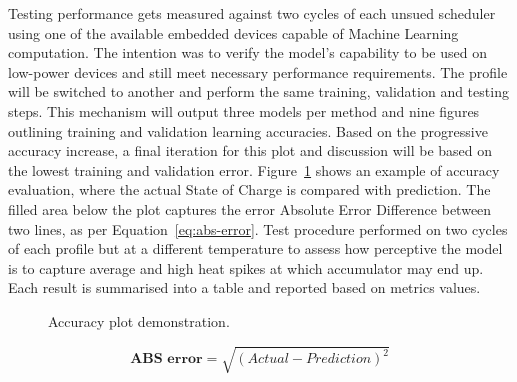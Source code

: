 %
Testing performance gets measured against two cycles of each unsued scheduler using one of the available embedded devices capable of Machine Learning computation.
The intention was to verify the model's capability to be used on low-power devices and still meet necessary performance requirements.
The profile will be switched to another and perform the same training, validation and testing steps.
This mechanism will output three models per method and nine figures outlining training and validation learning accuracies.
Based on the progressive accuracy increase, a final iteration for this plot and discussion will be based on the lowest training and validation error.
Figure~\ref{fig:plot_demo} shows an example of accuracy evaluation, where the actual State of Charge is compared with prediction.
The filled area below the plot captures the error Absolute Error Difference between two lines, as per Equation~\ref{eq:abs-error}.
Test procedure performed on two cycles of each profile but at a different temperature to assess how perceptive the model is to capture average and high heat spikes at which accumulator may end up.
Each result is summarised into a table and reported based on metrics values.
\begin{figure}[ht]
    \centering
    
    \caption{Accuracy plot demonstration.}
    \label{fig:plot_demo}
\end{figure}
\begin{equation}
    \textbf{ABS error}  = \sqrt{(Actual-Prediction)^2}
    \label{eq:abs-error}
\end{equation}
%
%
%

